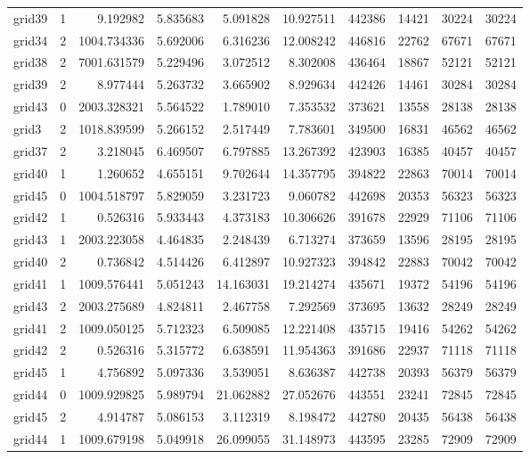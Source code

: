 \begin{longtable}{|l|r|r|r|r|r|r|r|r|r|}
grid39 & 1 & 9.192982 & 5.835683 & 5.091828 & 10.927511 & 442386 & 14421 & 30224 & 30224 \\
grid34 & 2 & 1004.734336 & 5.692006 & 6.316236 & 12.008242 & 446816 & 22762 & 67671 & 67671 \\
grid38 & 2 & 7001.631579 & 5.229496 & 3.072512 & 8.302008 & 436464 & 18867 & 52121 & 52121 \\
grid39 & 2 & 8.977444 & 5.263732 & 3.665902 & 8.929634 & 442426 & 14461 & 30284 & 30284 \\
grid43 & 0 & 2003.328321 & 5.564522 & 1.789010 & 7.353532 & 373621 & 13558 & 28138 & 28138 \\
grid3 & 2 & 1018.839599 & 5.266152 & 2.517449 & 7.783601 & 349500 & 16831 & 46562 & 46562 \\
grid37 & 2 & 3.218045 & 6.469507 & 6.797885 & 13.267392 & 423903 & 16385 & 40457 & 40457 \\
grid40 & 1 & 1.260652 & 4.655151 & 9.702644 & 14.357795 & 394822 & 22863 & 70014 & 70014 \\
grid45 & 0 & 1004.518797 & 5.829059 & 3.231723 & 9.060782 & 442698 & 20353 & 56323 & 56323 \\
grid42 & 1 & 0.526316 & 5.933443 & 4.373183 & 10.306626 & 391678 & 22929 & 71106 & 71106 \\
grid43 & 1 & 2003.223058 & 4.464835 & 2.248439 & 6.713274 & 373659 & 13596 & 28195 & 28195 \\
grid40 & 2 & 0.736842 & 4.514426 & 6.412897 & 10.927323 & 394842 & 22883 & 70042 & 70042 \\
grid41 & 1 & 1009.576441 & 5.051243 & 14.163031 & 19.214274 & 435671 & 19372 & 54196 & 54196 \\
grid43 & 2 & 2003.275689 & 4.824811 & 2.467758 & 7.292569 & 373695 & 13632 & 28249 & 28249 \\
grid41 & 2 & 1009.050125 & 5.712323 & 6.509085 & 12.221408 & 435715 & 19416 & 54262 & 54262 \\
grid42 & 2 & 0.526316 & 5.315772 & 6.638591 & 11.954363 & 391686 & 22937 & 71118 & 71118 \\
grid45 & 1 & 4.756892 & 5.097336 & 3.539051 & 8.636387 & 442738 & 20393 & 56379 & 56379 \\
grid44 & 0 & 1009.929825 & 5.989794 & 21.062882 & 27.052676 & 443551 & 23241 & 72845 & 72845 \\
grid45 & 2 & 4.914787 & 5.086153 & 3.112319 & 8.198472 & 442780 & 20435 & 56438 & 56438 \\
grid44 & 1 & 1009.679198 & 5.049918 & 26.099055 & 31.148973 & 443595 & 23285 & 72909 & 72909 \\

\end{longtable}

